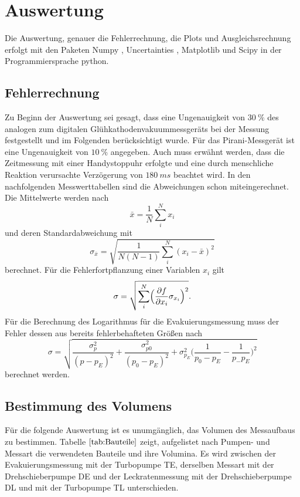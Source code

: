 \section{Auswertung}
Die Auswertung, genauer die Fehlerrechnung, die Plots und Ausgleichsrechnung erfolgt mit den Paketen
Numpy \cite{numpy}, Uncertainties \cite{uncertainties}, Matplotlib \cite{matplotlib} und Scipy \cite{scipy} in der Programmiersprache python.
\subsection{Fehlerrechnung}
Zu Beginn der Auswertung sei gesagt, dass eine Ungenauigkeit von $\SI{30}{\percent}$ des analogen zum digitalen Glühkathodenvakuummessgeräts
bei der Messung festgestellt und im Folgenden berücksichtigt wurde.
Für das Pirani-Messgerät ist eine Ungenauigkeit von $\SI{10}{\percent}$ angegeben\cite{anleitung}.
Auch muss erwähnt werden, dass die Zeitmessung mit einer Handystoppuhr erfolgte und eine durch menschliche Reaktion verursachte
Verzögerung von $\SI{180}{ms}$ beachtet wird\cite{reaktion}.
In den nachfolgenden Messwerttabellen sind die Abweichungen schon miteingerechnet.\\
Die Mittelwerte werden nach
\begin{equation}
	\bar{x}=\frac{1}{N}\sum_{i}^N x_i
\end{equation}
und deren Standardabweichung mit
\begin{equation}
	\sigma_{\bar{x}} = \sqrt{\frac{1}{N(N-1)} \sum_{i}^N (x_i-\bar{x})^2}
\end{equation}
berechnet.
Für die Fehlerfortpflanzung einer Variablen $x_i$ gilt
\begin{equation}
	\sigma = \sqrt{\sum_{i}^N \Bigl(\frac{\partial f}{\partial x_i} \sigma_{x_i}\Bigr)^2}.
	\label{eq:gaussfehler}
\end{equation}
Für die Berechnung des Logarithmus für die Evakuierungsmessung muss der Fehler dessen aus bereits fehlerbehafteten Größen nach
\begin{equation}
	\sigma = \sqrt{\frac{\sigma_p^2}{(p-p_E)^2}+\frac{\sigma_{p0}^2}{(p_0-p_E)^2}+\sigma_{p_E}^2\bigl(\frac{1}{p_0-p_E}-\frac{1}{p_-p_E}\bigr)^2}
\end{equation}
berechnet werden.
\subsection{Bestimmung des Volumens}
Für die folgende Auswertung ist es unumgänglich, das Volumen des Messaufbaus zu bestimmen.
Tabelle $\ref{tab:Bauteile}$ zeigt, aufgelistet nach Pumpen- und Messart die verwendeten Bauteile und ihre Volumina.
Es wird zwischen der Evakuierungsmessung mit der Turbopumpe TE, derselben Messart mit der Drehschieberpumpe DE und der Leckratenmessung
mit der Drehschieberpumpe DL und mit der Turbopumpe TL unterschieden.\newline

